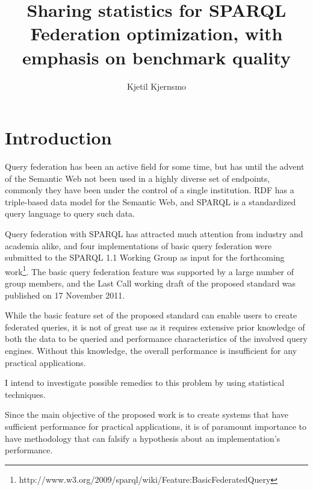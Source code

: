 \documentclass{llncs}
\begin{document}
\title{Sharing statistics for SPARQL Federation optimization, with
  emphasis on benchmark quality}
\author{Kjetil Kjernsmo}



\maketitle


\begin{abstract}


\end{abstract}

\section{Introduction}

Query federation has been an active field for some time, but has until
the advent of the Semantic Web not been used in a highly diverse set
of endpoints, commonly they have been under the control of a single
institution. RDF has a triple-based data model for the Semantic Web,
and SPARQL is a standardized query language to query such data.

Query federation with SPARQL has attracted much attention
from industry and academia alike, and four implementations of basic
query federation were submitted to the SPARQL 1.1 Working Group as
input for the forthcoming
work\footnote{http://www.w3.org/2009/sparql/wiki/Feature:BasicFederatedQuery}. 
The basic query federation feature was
supported by a large number of group members, and the Last Call working
draft of the proposed standard was published on 17 November 2011.

While the basic feature set of the proposed standard can enable users
to create federated queries, it is not of great use as it requires
extensive prior knowledge of both the data to be queried and
performance characteristics of the involved query engines. Without
this knowledge, the overall performance is insufficient for any
practical applications.

I intend to investigate possible remedies to this problem by using
statistical techniques. 

Since the main objective of the proposed work is to create systems
that have sufficient performance for practical applications, it is of
paramount importance to have methodology that can falsify a
hypothesis about an implementation's performance.
\end{document}
